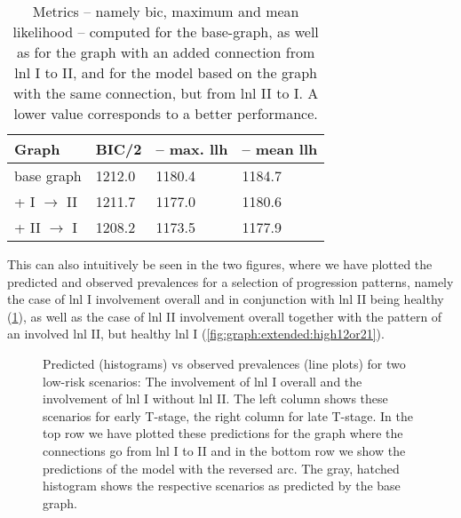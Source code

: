 \documentclass[\relativeRoot/main.tex]{subfiles}
\begin{document}
\begin{table}
    \centering
        \begin{tabular}{|l|l|l|l|}
            \hline
            \textbf{Graph} & \textbf{BIC/2} & \textbf{-- max. llh} & \textbf{-- mean llh} \\
            \hline
            base graph & 1212.0 & 1180.4 & 1184.7 \\
            + I $\rightarrow$ II & 1211.7 & 1177.0 & 1180.6 \\
            + II $\rightarrow$ I & 1208.2 & 1173.5 & 1177.9 \\
            \hline
        \end{tabular}
        \caption[
            Comparison of performance metrics for connection between LNL I and II
        ]{
            Metrics -- namely \gls{bic}, maximum and mean likelihood -- computed for the base-graph, as well as for the graph with an added connection from \gls{lnl} I to II, and for the model based on the graph with the same connection, but from \gls{lnl} II to I. A lower value corresponds to a better performance.
        }
        \label{table:graph:extend:12or21}
\end{table}

This can also intuitively be seen in the two figures, where we have plotted the predicted and observed prevalences for a selection of progression patterns, namely the case of \gls{lnl} I involvement overall and in conjunction with \gls{lnl} II being healthy (\cref{fig:graph:extended:low12or21}), as well as the case of \gls{lnl} II involvement overall together with the pattern of an involved \gls{lnl} II, but healthy \gls{lnl} I (\cref{fig:graph:extended:high12or21}).

\begin{figure}
    \centering
    \def\svgwidth{1.0\textwidth}
    
    \caption[
        Comparison of prevalences of low-risk scenarios for the two directions of the arc between LNL I and II
    ]{
        Predicted (histograms) vs observed prevalences (line plots) for two low-risk scenarios: The involvement of \gls{lnl} I overall and the involvement of \gls{lnl} I without \gls{lnl} II. The left column shows these scenarios for early T-stage, the right column for late T-stage. In the top row we have plotted these predictions for the graph where the connections go from \gls{lnl} I to II and in the bottom row we show the predictions of the model with the reversed arc. The gray, hatched histogram shows the respective scenarios as predicted by the base graph.
    }
    \label{fig:graph:extended:low12or21}
\end{figure}
\end{document}
